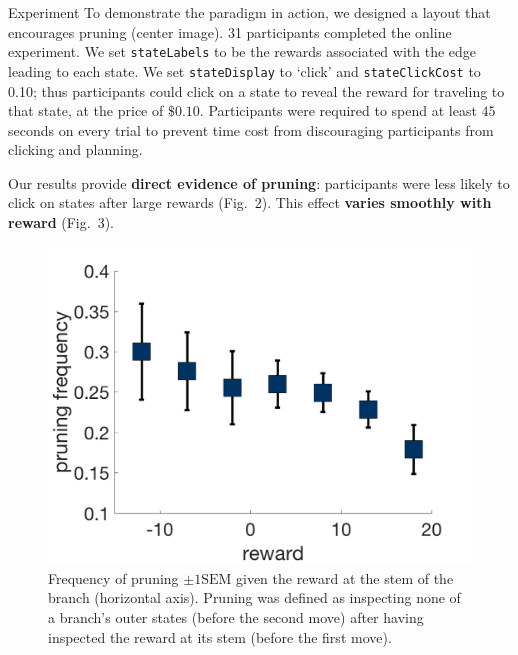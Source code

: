 \documentclass[final]{beamer}
\newlength{\onecolwid}
\begin{document}
\begin{frame}[t, fragile]
\begin{columns}[t]
\begin{column}{\onecolwid}
  \begin{block}{Experiment}\label{experiment}
  To demonstrate the paradigm in action, we designed a layout that encourages pruning (center image). 31 participants completed the online experiment. We set \texttt{stateLabels} to be the rewards associated with the edge leading to each state. We set \texttt{stateDisplay} to `click' and \texttt{stateClickCost} to 0.10; thus participants could click on a state to reveal the reward for traveling to that state, at the price of $\$0.10$. Participants were required to spend at least $45$ seconds on every trial to prevent time cost from discouraging participants from clicking and planning.

  Our results provide \textbf{direct evidence of pruning}: participants were less likely to click on states after large rewards (Fig.~2). This effect \textbf{varies smoothly with reward} (Fig.~3).

  \end{block}


  \begin{figure}
    \label{fig:pruning}
    \includegraphics[width=0.9\linewidth]{figs/prunning_any_noFB.png}
    \captionsetup{width=0.9\linewidth}
    \caption[first]{Frequency of pruning $\pm 1 \text{SEM}$ given the reward at the stem of the branch (horizontal axis). Pruning was defined as inspecting none of a branch's outer states (before the second move) after having inspected the reward at its stem (before the first move).}
  \end{figure}


\end{column}
\end{columns}
\end{frame}
\end{document}
